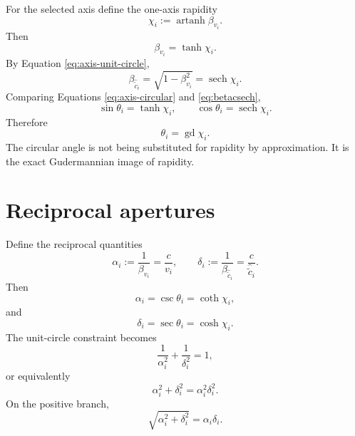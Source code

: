 \documentclass[11pt]{article}
\DeclareMathOperator{\sech}{sech}
\DeclareMathOperator{\gd}{gd}
\DeclareMathOperator{\artanh}{artanh}
\newcommand{\ccomp}[1]{\widehat{\widetilde{c}}_{#1}}
\begin{document}
For the selected axis define the one-axis rapidity
\begin{equation}
\chi_i:=\artanh\beta_{v_i}.
\label{eq:chii}
\end{equation}
Then
\begin{equation}
\beta_{v_i}=\tanh\chi_i.
\label{eq:betatanh}
\end{equation}
By Equation \eqref{eq:axis-unit-circle},
\begin{equation}
\beta_{\ccomp{i}}
=
\sqrt{1-\beta_{v_i}^2}
=
\sech\chi_i.
\label{eq:betacsech}
\end{equation}
Comparing Equations \eqref{eq:axis-circular} and \eqref{eq:betacsech},
\begin{equation}
\sin\theta_i=\tanh\chi_i,
\qquad
\cos\theta_i=\sech\chi_i.
\label{eq:axis-gd}
\end{equation}
Therefore
\begin{equation}
\theta_i=\gd\chi_i.
\label{eq:axis-gudermannian}
\end{equation}
The circular angle is not being substituted for rapidity by approximation.
It is the exact Gudermannian image of rapidity.

\section{Reciprocal apertures}

Define the reciprocal quantities
\begin{equation}
\alpha_i
:=
\frac{1}{\beta_{v_i}}
=
\frac{c}{v_i},
\qquad
\delta_i
:=
\frac{1}{\beta_{\ccomp{i}}}
=
\frac{c}{\ccomp{i}}.
\label{eq:alphadelta}
\end{equation}
Then
\begin{equation}
\alpha_i=\csc\theta_i=\coth\chi_i,
\label{eq:alpha-identities}
\end{equation}
and
\begin{equation}
\delta_i=\sec\theta_i=\cosh\chi_i.
\label{eq:delta-identities}
\end{equation}
The unit-circle constraint becomes
\begin{equation}
\frac{1}{\alpha_i^2}
+
\frac{1}{\delta_i^2}
=1,
\label{eq:reciprocal-constraint}
\end{equation}
or equivalently
\begin{equation}
\alpha_i^2+\delta_i^2
=
\alpha_i^2\delta_i^2.
\label{eq:reciprocal-pythagoras}
\end{equation}
On the positive branch,
\begin{equation}
\sqrt{\alpha_i^2+\delta_i^2}
=
\alpha_i\delta_i.
\label{eq:reciprocal-hypotenuse}
\end{equation}
\end{document}
